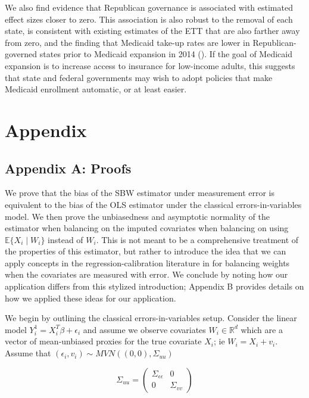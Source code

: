 \documentclass[12pt]{article}
\begin{document}
We also find evidence that Republican governance is associated with estimated effect sizes closer to zero. This association is also robust to the removal of each state, is consistent with existing estimates of the ETT that are also farther away from zero, and the finding that Medicaid take-up rates are lower in Republican-governed states prior to Medicaid expansion in 2014 (\cite{sommers2012understanding}). If the goal of Medicaid expansion is to increase access to insurance for low-income adults, this suggests that state and federal governments may wish to adopt policies that make Medicaid enrollment automatic, or at least easier.

\cleardoublepage
 

\cleardoublepage

\section{Appendix}

\subsection{Appendix A: Proofs}

We prove that the bias of the SBW estimator under measurement error is equivalent to the bias of the OLS estimator under the classical errors-in-variables model. We then prove the unbiasedness and asymptotic normality of the estimator when balancing on the imputed covariates when balancing on using $\mathbb{E}\{X_i \mid W_i\}$ instead of $W_i$. This is not meant to be a comprehensive treatment of the properties of this estimator, but rather to introduce the idea that we can apply concepts in the regression-calibration literature in for balancing weights when the covariates are measured with error. We conclude by noting how our application differs from this stylized introduction; Appendix B provides details on how we applied these ideas for our application.

We begin by outlining the classical errors-in-variables setup. Consider the linear model $Y_i^1 = X_i^T\beta + \epsilon_i$ and assume we observe covariates $W_i \in \mathbb{R}^d$ which are a vector of mean-unbiased proxies for the true covariate $X_i$; ie $W_i = X_i + v_i$. Assume that $(\epsilon_i, v_i) \sim MVN((0,0), \Sigma_{uu})$ 

$$
\Sigma_{uu} = \begin{pmatrix} 
\Sigma_{\epsilon\epsilon} & 0 \\ 
0 & \Sigma_{vv} 
\end{pmatrix}
$$ 
\end{document}
